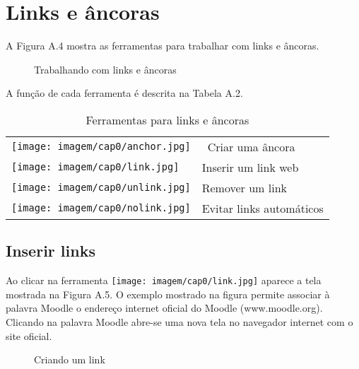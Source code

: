 \section{Links e âncoras}


A Figura A.4 mostra as ferramentas para trabalhar com links e âncoras.

\begin{figure}
 \begin{center}
  \caption{Trabalhando com links e âncoras}
 \end{center}
\end{figure}

A função de cada ferramenta é descrita na Tabela A.2.

\begin{table}
\begin{center}
 \begin{tabular}{m{0.5cm} m{4.0cm}} \\
  \texttt{[image: imagem/cap0/anchor.jpg]} & \ Criar uma âncora \\
  \texttt{[image: imagem/cap0/link.jpg]} & Inserir um link web \\
  \texttt{[image: imagem/cap0/unlink.jpg]} & Remover um link \\
  \texttt{[image: imagem/cap0/nolink.jpg]} & Evitar links automáticos \\  \hline
 \end{tabular}
\caption{Ferramentas para links e âncoras}
\end{center}
\end{table}

\subsection{Inserir links}

Ao clicar na ferramenta \texttt{[image: imagem/cap0/link.jpg]} aparece a tela mostrada na Figura A.5. O exemplo mostrado na figura permite associar à palavra Moodle o endereço internet oficial do Moodle (www.moodle.org). Clicando na palavra Moodle abre-se uma nova tela no navegador internet com o site oficial.

\begin{figure}
 \begin{center}
  \caption{Criando um link}
 \end{center}
\end{figure}

